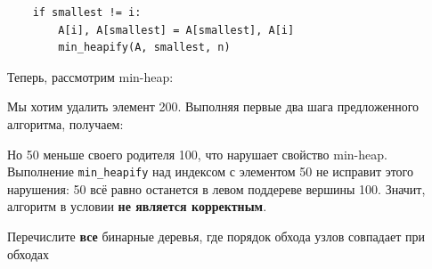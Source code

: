 \documentclass[12pt]{exam}
\begin{document}
\begin{questions}
\begin{solution}
\begin{verbatim}
    if smallest != i:
        A[i], A[smallest] = A[smallest], A[i]
        min_heapify(A, smallest, n)
\end{verbatim}

Теперь, рассмотрим min-heap:
\begin{center}
\end{center}

Мы хотим удалить элемент 200. Выполняя первые два шага предложенного алгоритма, получаем:
\begin{center}
\end{center}

Но 50 меньше своего родителя 100, что нарушает свойство min-heap. Выполнение {\tt min\_heapify} над индексом с элементом 50 не исправит этого нарушения: 50 всё равно останется в левом поддереве вершины 100. Значит, алгоритм в условии {\bf не является корректным}. 
\end{solution}



\question[5] Перечислите {\bf все} бинарные деревья, где порядок обхода узлов совпадает при обходах
\noaddpoints
{}
\end{questions}
\end{document}
